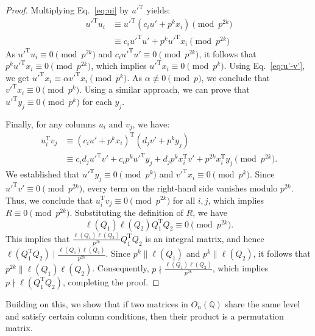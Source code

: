 \documentclass[12pt]{article}
\theoremstyle{plain}
\theoremstyle{definition}
\newcommand{\trans}{^{\mathrm{T}}}
\begin{document}
\begin{proof}
Multiplying Eq.~\eqref{eq:ui} by ${u'}\trans$ yields:
\begin{align*}
{u'}\trans u_i &\equiv {u'}\trans (c_i u' + p^{k}x_i) \pmod{p^{2k}} \\
&\equiv c_i {u'}\trans u' + p^{k}{u'}\trans x_i \pmod{p^{2k}}
\end{align*}
As ${u'}\trans u_i \equiv 0 \pmod{p^{2k}}$ and $c_i {u'}\trans u' \equiv 0 \pmod{p^{2k}}$, it follows that $p^{k} {u'}\trans x_i \equiv 0 \pmod{p^{2k}}$, which implies ${u'}\trans x_i \equiv 0 \pmod{p^{k}}$. Using Eq.~\eqref{eq:u'-v'}, we get ${u'}\trans x_i \equiv \alpha {v'}\trans x_i \pmod{p^{k}}$. As $\alpha \not\equiv 0 \pmod{p}$, we conclude that ${v'}\trans x_i \equiv 0 \pmod{p^{k}}$. Using a similar approach, we can prove that ${u'}\trans y_j \equiv 0 \pmod{p^{k}}$ for each $y_j$.

Finally, for any columns $u_i$ and $v_j$, we have:
\begin{align*}
u_i\trans v_j &\equiv (c_i u' + p^{k} x_i)\trans (d_j v' + p^{k} y_j) \\
&\equiv c_i d_j {u'}\trans v' + c_i p^{k} {u'}\trans y_j + d_j p^{k} x_i\trans v' + p^{2k} x_i\trans y_j \pmod{p^{2k}}.
\end{align*}
We established that ${u'}\trans y_j \equiv 0 \pmod{p^{k}}$ and ${v'}\trans x_i \equiv 0 \pmod{p^{k}}$. Since ${u'}\trans v' \equiv 0 \pmod{p^{2k}}$, every term on the right-hand side vanishes modulo $p^{2k}$. Thus, we conclude that $u_i\trans v_j \equiv 0 \pmod{p^{2k}}$ for all $i, j$, which implies $R \equiv 0 \pmod{p^{2k}}$. Substituting the definition of $R$, we have
$$\ell(Q_1)\ell(Q_2) Q_1\trans Q_2 \equiv 0 \pmod{p^{2k}}.$$
This implies that  $\frac{\ell(Q_1)\ell(Q_2)}{p^{2k}} Q_1\trans Q_2$ is an integral matrix, and hence $\ell(Q_1\trans Q_2) \mid \frac{\ell(Q_1)\ell(Q_2)}{p^{2k}}$. Since $p^k \parallel \ell(Q_1)$ and $p^k \parallel \ell(Q_2)$, it follows that $p^{2k} \parallel \ell(Q_1)\ell(Q_2)$. Consequently, $p \nmid \frac{\ell(Q_1)\ell(Q_2)}{p^{2k}}$, which implies $p \nmid \ell(Q_1\trans Q_2)$, completing the proof.

\end{proof}

Building on this, we show that if two matrices in $O_n(\mathbb{Q})$ share the same level and satisfy certain column conditions, then their product is a permutation matrix.
\end{document}
